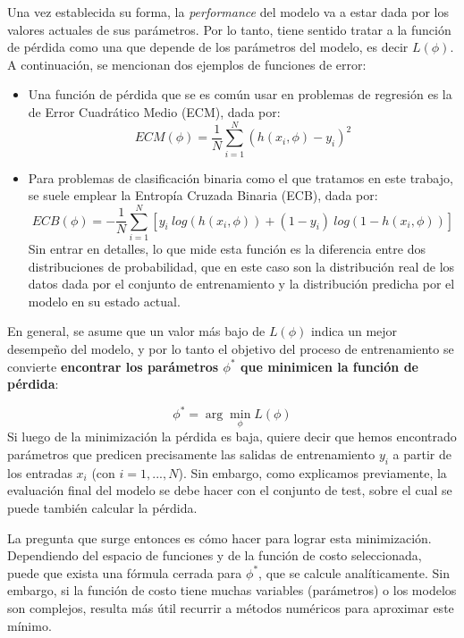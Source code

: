 \documentclass[../../main.tex]{subfiles}
\begin{document}
Una vez establecida su forma, la \textit{performance} del modelo va a estar dada por los valores actuales de sus parámetros. Por lo tanto, tiene sentido tratar a la función de pérdida como una que depende de los parámetros del modelo, es decir \(L(\phi)\)\footnotemark.
 A continuación, se mencionan dos ejemplos de funciones de error:
\begin{itemize}
    \item Una función de pérdida que se es común usar en problemas de regresión es la de Error Cuadrático Medio (ECM), dada por:
    \[
    ECM(\phi) = \frac{1}{N} \sum_{i=1}^{N} \left(h(x_i, \phi) - y_i\right)^2
    \]
    \item Para problemas de clasificación binaria como el que tratamos en este trabajo, se suele emplear la Entropía Cruzada Binaria (ECB), dada por:
    \[
    ECB(\phi) = -\frac{1}{N} \sum_{i=1}^{N}
        \left[
            y_i\ log(h(x_i, \phi)) + (1 - y_i)\ log(1 - h(x_i, \phi))
        \right]
    \]
    Sin entrar en detalles, lo que mide esta función es la diferencia entre dos distribuciones de probabilidad, que en este caso son la distribución real de los datos dada por el conjunto de entrenamiento y la distribución predicha por el modelo en su estado actual.
\end{itemize}

En general, se asume que un valor más bajo de \(L(\phi)\) indica un mejor desempeño del modelo, y por lo tanto el objetivo del proceso de entrenamiento se convierte \textbf{encontrar los parámetros \(\phi^*\) que minimicen la función de pérdida}:

\[
\phi^* = \arg\min_{\phi} L(\phi)
\]
Si luego de la minimización la pérdida es baja, quiere decir que hemos encontrado parámetros que predicen precisamente las salidas de entrenamiento \(y_i\) a partir de los entradas \(x_i\) (con \(i=1,...,N\)). Sin embargo, como explicamos previamente, la evaluación final del modelo se debe hacer con el conjunto de test, sobre el cual se puede también calcular la pérdida.

La pregunta que surge entonces es cómo hacer para lograr esta minimización. Dependiendo del espacio de funciones y de la función de costo seleccionada, puede que exista una fórmula cerrada para \(\phi^*\), que se calcule analíticamente. Sin embargo, si la función de costo tiene muchas variables (parámetros) o los modelos son complejos, resulta más útil recurrir a métodos numéricos para aproximar este mínimo.
\end{document}
